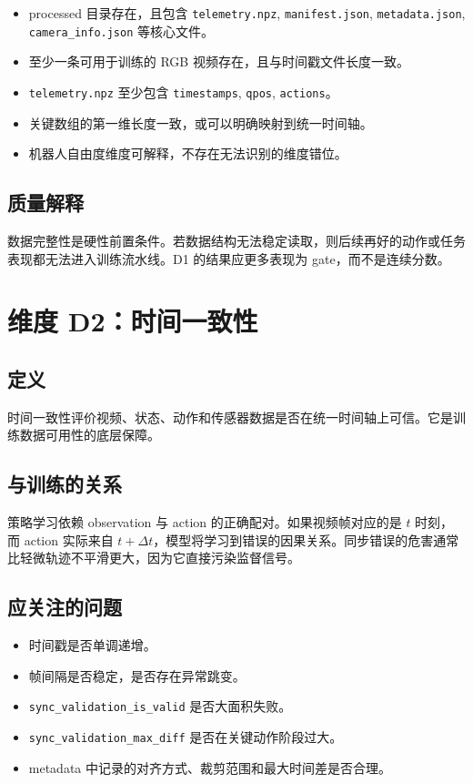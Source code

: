 \documentclass[UTF8,zihao=-4]{ctexart}
\begin{document}
\begin{itemize}
  \item processed 目录存在，且包含 \texttt{telemetry.npz}, \texttt{manifest.json}, \texttt{metadata.json}, \texttt{camera\_info.json} 等核心文件。
  \item 至少一条可用于训练的 RGB 视频存在，且与时间戳文件长度一致。
  \item \texttt{telemetry.npz} 至少包含 \texttt{timestamps}, \texttt{qpos}, \texttt{actions}。
  \item 关键数组的第一维长度一致，或可以明确映射到统一时间轴。
  \item 机器人自由度维度可解释，不存在无法识别的维度错位。
\end{itemize}

\subsection{质量解释}

数据完整性是硬性前置条件。若数据结构无法稳定读取，则后续再好的动作或任务表现都无法进入训练流水线。D1 的结果应更多表现为 gate，而不是连续分数。

\section{维度 D2：时间一致性}

\subsection{定义}

时间一致性评价视频、状态、动作和传感器数据是否在统一时间轴上可信。它是训练数据可用性的底层保障。

\subsection{与训练的关系}

策略学习依赖 observation 与 action 的正确配对。如果视频帧对应的是 $t$ 时刻，而 action 实际来自 $t+\Delta t$，模型将学习到错误的因果关系。同步错误的危害通常比轻微轨迹不平滑更大，因为它直接污染监督信号。

\subsection{应关注的问题}

\begin{itemize}
  \item 时间戳是否单调递增。
  \item 帧间隔是否稳定，是否存在异常跳变。
  \item \texttt{sync\_validation\_is\_valid} 是否大面积失败。
  \item \texttt{sync\_validation\_max\_diff} 是否在关键动作阶段过大。
  \item metadata 中记录的对齐方式、裁剪范围和最大时间差是否合理。
\end{itemize}
\end{document}
